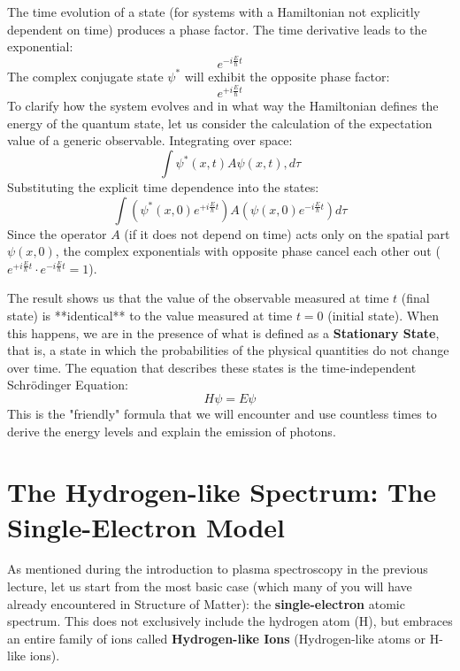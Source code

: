 The time evolution of a state (for systems with a Hamiltonian not explicitly dependent on time) produces a phase factor. The time derivative leads to the exponential:
\begin{equation}
e^{-i \frac{E}{\hbar} t}
\end{equation}
The complex conjugate state $\psi^*$ will exhibit the opposite phase factor:
\begin{equation}
e^{+i \frac{E}{\hbar} t}
\end{equation}
To clarify how the system evolves and in what way the Hamiltonian defines the energy of the quantum state, let us consider the calculation of the expectation value of a generic observable. Integrating over space:
\begin{equation}
\int \psi^*(x,t) A \psi(x,t) , d\tau
\end{equation}
Substituting the explicit time dependence into the states:
\begin{equation}
\int \left( \psi^*(x,0) e^{+i \frac{E}{\hbar} t} \right) A \left( \psi(x,0) e^{-i \frac{E}{\hbar} t} \right) d\tau
\end{equation}
Since the operator $A$ (if it does not depend on time) acts only on the spatial part $\psi(x,0)$, the complex exponentials with opposite phase cancel each other out ($e^{+i \frac{E}{\hbar} t} \cdot e^{-i \frac{E}{\hbar} t} = 1$).

The result shows us that the value of the observable measured at time $t$ (final state) is **identical** to the value measured at time $t=0$ (initial state).
When this happens, we are in the presence of what is defined as a \textbf{Stationary State}, that is, a state in which the probabilities of the physical quantities do not change over time.
The equation that describes these states is the time-independent Schrödinger Equation:
\begin{equation}
H \psi = E \psi
\end{equation}
This is the "friendly" formula that we will encounter and use countless times to derive the energy levels and explain the emission of photons.

\section{The Hydrogen-like Spectrum: The Single-Electron Model}

As mentioned during the introduction to plasma spectroscopy in the previous lecture, let us start from the most basic case (which many of you will have already encountered in Structure of Matter): the \textbf{single-electron} atomic spectrum.
This does not exclusively include the hydrogen atom (H), but embraces an entire family of ions called \textbf{Hydrogen-like Ions} (Hydrogen-like atoms or H-like ions).

